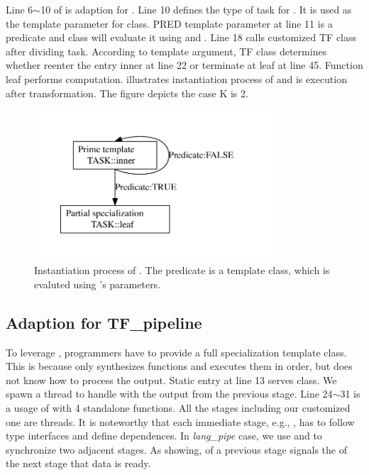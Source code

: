 Line 6$\sim$10 of  is adaption for . Line 10
defines the type of task for . It is used as
the template parameter  for  class. PRED template
parameter at line 11 is a predicate and  class will
evaluate it using  and . Line 18 calls customized TF class after dividing
task. According to template argument, TF class determines whether
reenter the entry inner at line 22 or terminate at leaf at
line 45. Function leaf performs computation.  illustrates
instantiation process of  and  is
execution after transformation. The figure depicts the case K is 2.

\begin{figure}[hpt]
  \includegraphics[width=3.5in]{../algo}
  \caption{Instantiation process of . The predicate is a template
class, which is evaluted using 's parameters.}
  \label{fig:hierarchy}
\end{figure}


\subsection{Adaption for TF\_pipeline}

To leverage , programmers have to provide a full
specialization template class. This is because 
only synthesizes functions and executes them in order, but does not
know how to process the output.
Static entry at line 13 serves  class. We spawn a thread to handle with the output 
from the previous stage. Line 24$\sim$31 is a usage of  with 4
standalone functions. All the stages including our customized one are
threads. It is noteworthy that each immediate stage, e.g.,
, has to follow type interfaces and
define dependences. In \textit{lang\_pipe} case, we use  and
 to synchronize two adjacent stages.
As  showing,  of a previous stage signals the
 of the next stage that data is ready.

